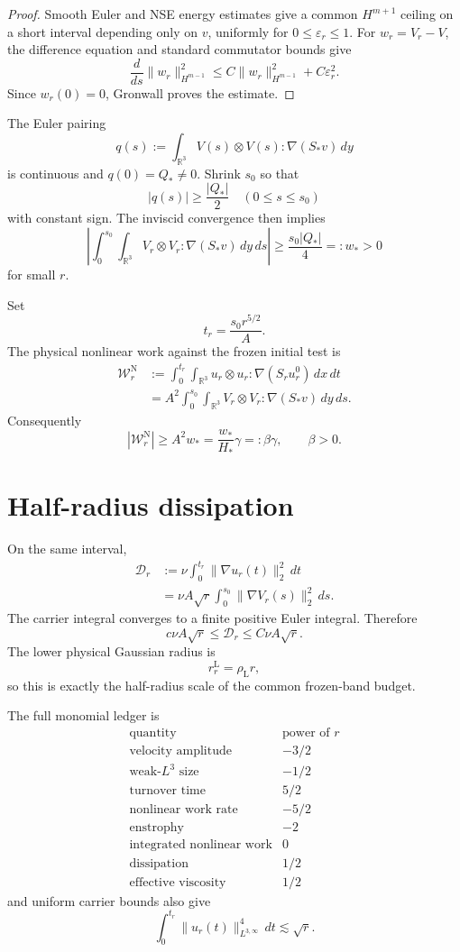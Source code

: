 \documentclass[11pt]{article}
\theoremstyle{remark}
\newcommand{\R}{\mathbb R}
\newcommand{\Diss}{\mathcal{D}}
\newcommand{\WN}{\mathcal W^{\mathrm N}}
\begin{document}
\begin{proof}
Smooth Euler and NSE energy estimates give a common \(H^{m+1}\) ceiling on
a short interval depending only on \(v\), uniformly for
\(0\le\varepsilon_r\le1\).  For \(w_r=V_r-V\), the difference equation and
standard commutator bounds give
\[
 \frac{d}{ds}\|w_r\|_{H^{m-1}}^2
 \le
 C\|w_r\|_{H^{m-1}}^2+C\varepsilon_r^2.
\]
Since \(w_r(0)=0\), Gronwall proves the estimate.
\end{proof}

The Euler pairing
\[
 q(s)
 :=
 \int_{\R^3}
 V(s)\otimes V(s):\nabla(S_*v)\,dy
\]
is continuous and \(q(0)=Q_*\ne0\).  Shrink \(s_0\) so that
\[
 |q(s)|\ge\frac{|Q_*|}{2}
 \quad(0\le s\le s_0)
\]
with constant sign.  The inviscid convergence then implies
\[
 \left|
 \int_0^{s_0}\!\!\int_{\R^3}
 V_r\otimes V_r:\nabla(S_*v)\,dy\,ds
 \right|
 \ge
 \frac{s_0|Q_*|}{4}
 =:w_*>0
\]
for small \(r\).

Set
\[
 t_r=\frac{s_0r^{5/2}}{A}.
\]
The physical nonlinear work against the frozen initial test is
\[
\begin{aligned}
 \WN_r
 &:=
 \int_0^{t_r}\!\!\int_{\R^3}
 u_r\otimes u_r:\nabla(S_ru_r^0)\,dx\,dt\\
 &=
 A^2
 \int_0^{s_0}\!\!\int_{\R^3}
 V_r\otimes V_r:\nabla(S_*v)\,dy\,ds.
\end{aligned}
\]
Consequently
\[
\boxed{
 |\WN_r|
 \ge
 A^2w_*
 =
 \frac{w_*}{H_*}\gamma
 =:\beta\gamma,
 \qquad \beta>0.
}
\]

\section{Half-radius dissipation}

On the same interval,
\[
\begin{aligned}
 \Diss_r
 &:=
 \nu\int_0^{t_r}\|\nabla u_r(t)\|_2^2\,dt\\
 &=
 \nu A\sqrt r
 \int_0^{s_0}\|\nabla V_r(s)\|_2^2\,ds.
\end{aligned}
\]
The carrier integral converges to a finite positive Euler integral.
Therefore
\[
\boxed{
 c\nu A\sqrt r
 \le
 \Diss_r
 \le
 C\nu A\sqrt r.
}
\]
The lower physical Gaussian radius is
\[
 r_r^{\mathrm L}=\rho_{\mathrm L}r,
\]
so this is exactly the half-radius scale of the common frozen-band budget.

The full monomial ledger is
\[
\begin{array}{c|c}
\text{quantity}&\text{power of }r\\ \hline
\text{velocity amplitude}&-3/2\\
\text{weak-}L^3\text{ size}&-1/2\\
\text{turnover time}&5/2\\
\text{nonlinear work rate}&-5/2\\
\text{enstrophy}&-2\\
\text{integrated nonlinear work}&0\\
\text{dissipation}&1/2\\
\text{effective viscosity}&1/2
\end{array}
\]
and uniform carrier bounds also give
\[
 \int_0^{t_r}
 \|u_r(t)\|_{L^{3,\infty}}^4\,dt
 \lesssim\sqrt r.
\]
\end{document}
